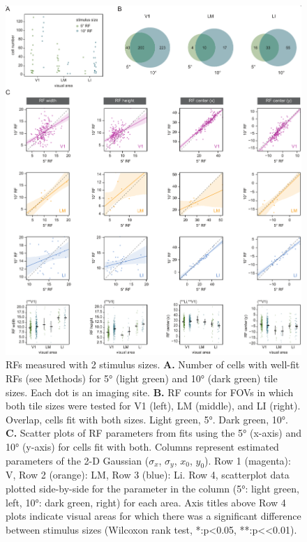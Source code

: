 \begin{figure}[tp!]
\includegraphics[width=\textwidth]{figures/supplemental/fig_s6_rf5_v_rf10/fig_s6_rf5_rf10.pdf}
    \caption[RF mapping stimuli]{RFs measured with 2 stimulus sizes.
    \textbf{A.} Number of cells with well-fit RFs (see Methods) for \ang{5} (light green) and \ang{10} (dark green) tile sizes. Each dot is an imaging site.
    \textbf{B.} RF counts for FOVs in which both tile sizes were tested for V1 (left), LM (middle), and LI (right). Overlap, cells fit with both sizes. Light green, \ang{5}. Dark green, \ang{10}.
    \textbf{C.} Scatter plots of RF parameters from fits using the \ang{5} (x-axis) and \ang{10} (y-axis) for cells fit with both. Columns represent estimated parameters of the 2-D Gaussian ($\sigma_x$, $\sigma_y$, $x_0$, $y_0$). Row 1 (magenta): V, Row 2 (orange): LM, Row 3 (blue): Li. Row 4, scatterplot data plotted side-by-side for the parameter in the column (\ang{5}: light green, left, \ang{10}: dark green, right) for each area. Axis titles above Row 4 plots indicate visual areas for which there was a significant difference between stimulus sizes (Wilcoxon rank test, *:p<0.05, **:p<<0.01).
    \label{supfig:rf5_rf10}}
\end{figure}

